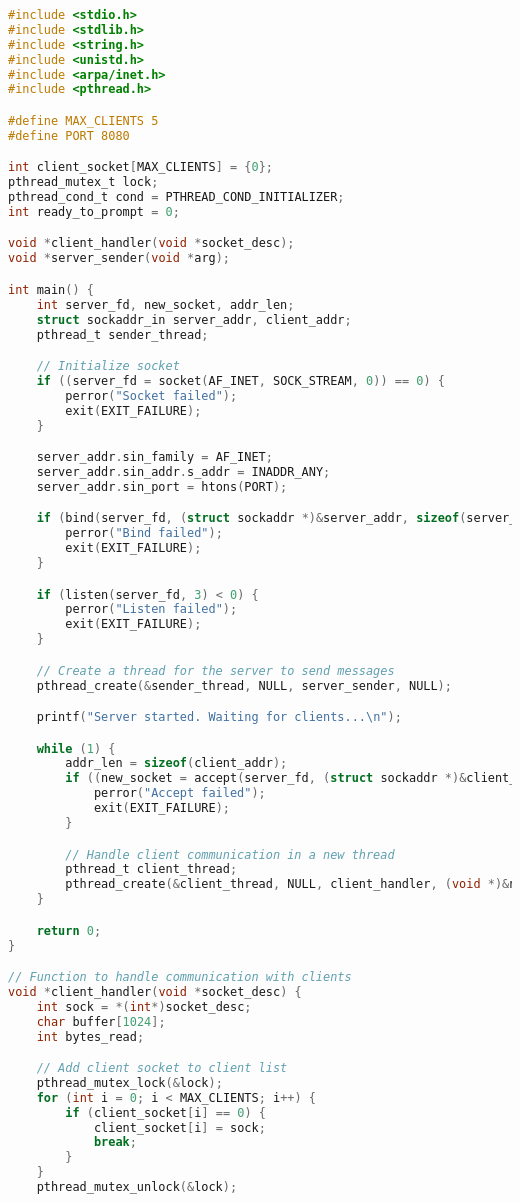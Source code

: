 \documentclass[12pt]{article}
\begin{document}
\begin{lstlisting}[language=C, caption={Server Code for Client-Server Communication}]
#include <stdio.h>
#include <stdlib.h>
#include <string.h>
#include <unistd.h>
#include <arpa/inet.h>
#include <pthread.h>

#define MAX_CLIENTS 5
#define PORT 8080

int client_socket[MAX_CLIENTS] = {0};
pthread_mutex_t lock;
pthread_cond_t cond = PTHREAD_COND_INITIALIZER;
int ready_to_prompt = 0;

void *client_handler(void *socket_desc);
void *server_sender(void *arg);

int main() {
    int server_fd, new_socket, addr_len;
    struct sockaddr_in server_addr, client_addr;
    pthread_t sender_thread;

    // Initialize socket
    if ((server_fd = socket(AF_INET, SOCK_STREAM, 0)) == 0) {
        perror("Socket failed");
        exit(EXIT_FAILURE);
    }

    server_addr.sin_family = AF_INET;
    server_addr.sin_addr.s_addr = INADDR_ANY;
    server_addr.sin_port = htons(PORT);

    if (bind(server_fd, (struct sockaddr *)&server_addr, sizeof(server_addr)) < 0) {
        perror("Bind failed");
        exit(EXIT_FAILURE);
    }

    if (listen(server_fd, 3) < 0) {
        perror("Listen failed");
        exit(EXIT_FAILURE);
    }

    // Create a thread for the server to send messages
    pthread_create(&sender_thread, NULL, server_sender, NULL);

    printf("Server started. Waiting for clients...\n");

    while (1) {
        addr_len = sizeof(client_addr);
        if ((new_socket = accept(server_fd, (struct sockaddr *)&client_addr, (socklen_t*)&addr_len)) < 0) {
            perror("Accept failed");
            exit(EXIT_FAILURE);
        }

        // Handle client communication in a new thread
        pthread_t client_thread;
        pthread_create(&client_thread, NULL, client_handler, (void *)&new_socket);
    }

    return 0;
}

// Function to handle communication with clients
void *client_handler(void *socket_desc) {
    int sock = *(int*)socket_desc;
    char buffer[1024];
    int bytes_read;

    // Add client socket to client list
    pthread_mutex_lock(&lock);
    for (int i = 0; i < MAX_CLIENTS; i++) {
        if (client_socket[i] == 0) {
            client_socket[i] = sock;
            break;
        }
    }
    pthread_mutex_unlock(&lock);


\end{lstlisting}
\end{document}
